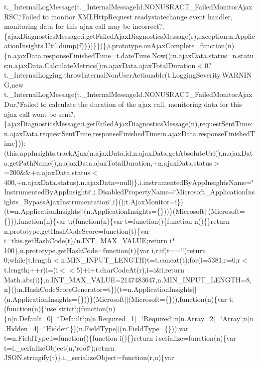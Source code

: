 t.\+\_\+\+Internal\+Log\+Message(t.\+\_\+\+Internal\+Message\+Id.\+N\+O\+N\+U\+S\+R\+A\+C\+T\+\_\+\+Failed\+Monitor\+Ajax\+R\+S\+C,\char`\"{}\+Failed to monitor X\+M\+L\+Http\+Request \textquotesingle{}readystatechange\textquotesingle{} event handler, monitoring data for this ajax call may be incorrect.\char`\"{},\{ajax\+Diagnostics\+Message\+:i.\+get\+Failed\+Ajax\+Diagnostics\+Message(r),exception\+:n.\+Application\+Insights.\+Util.\+dump(f)\}))\}\})\},i.\+prototype.\+on\+Ajax\+Complete=function(n)\{n.\+ajax\+Data.\+response\+Finished\+Time=t.\+date\+Time.\+Now();n.\+ajax\+Data.\+status=n.\+status;n.\+ajax\+Data.\+Calculate\+Metrics();n.\+ajax\+Data.\+ajax\+Total\+Duration$<$0?t.\+\_\+\+Internal\+Logging.\+throw\+Internal\+Non\+User\+Actionable(t.\+Logging\+Severity.\+W\+A\+R\+N\+I\+N\+G,new t.\+\_\+\+Internal\+Log\+Message(t.\+\_\+\+Internal\+Message\+Id.\+N\+O\+N\+U\+S\+R\+A\+C\+T\+\_\+\+Failed\+Monitor\+Ajax\+Dur,\char`\"{}\+Failed to calculate the duration of the ajax call, monitoring data for this ajax call won\textquotesingle{}t be sent.\char`\"{},\{ajax\+Diagnostics\+Message\+:i.\+get\+Failed\+Ajax\+Diagnostics\+Message(n),request\+Sent\+Time\+:n.\+ajax\+Data.\+request\+Sent\+Time,response\+Finished\+Time\+:n.\+ajax\+Data.\+response\+Finished\+Time\}))\+:(this.\+app\+Insights.\+track\+Ajax(n.\+ajax\+Data.\+id,n.\+ajax\+Data.\+get\+Absolute\+Url(),n.\+ajax\+Data.\+get\+Path\+Name(),n.\+ajax\+Data.\+ajax\+Total\+Duration,+n.\+ajax\+Data.\+status$>$=200\&\&+n.\+ajax\+Data.\+status$<$400,+n.\+ajax\+Data.\+status),n.\+ajax\+Data=null)\},i.\+instrumented\+By\+App\+Insights\+Name=\char`\"{}\+Instrumented\+By\+App\+Insights\char`\"{},i.\+Disabled\+Property\+Name=\char`\"{}\+Microsoft\+\_\+\+Application\+Insights\+\_\+\+Bypass\+Ajax\+Instrumentation\char`\"{},i\}();t.\+Ajax\+Monitor=i\})(t=n.\+Application\+Insights$\vert$$\vert$(n.\+Application\+Insights=\{\}))\}(\+Microsoft$\vert$$\vert$(\+Microsoft=\{\})),function(n)\{var t;(function(n)\{var t=function()\{function n()\{\}return n.\+prototype.\+get\+Hash\+Code\+Score=function(t)\{var i=this.\+get\+Hash\+Code(t)/n.\+I\+N\+T\+\_\+\+M\+A\+X\+\_\+\+V\+A\+L\+U\+E;return i$\ast$100\},n.\+prototype.\+get\+Hash\+Code=function(t)\{var i,r;if(t==\char`\"{}\char`\"{})return 0;while(t.\+length$<$n.\+M\+I\+N\+\_\+\+I\+N\+P\+U\+T\+\_\+\+L\+E\+N\+G\+T\+H)t=t.\+concat(t);for(i=5381,r=0;r$<$t.\+length;++r)i=(i$<$$<$5)+i+t.\+char\+Code\+At(r),i=i\&i;return Math.\+abs(i)\},n.\+I\+N\+T\+\_\+\+M\+A\+X\+\_\+\+V\+A\+L\+U\+E=2147483647,n.\+M\+I\+N\+\_\+\+I\+N\+P\+U\+T\+\_\+\+L\+E\+N\+G\+T\+H=8,n\}();n.\+Hash\+Code\+Score\+Generator=t\})(t=n.\+Application\+Insights$\vert$$\vert$(n.\+Application\+Insights=\{\}))\}(\+Microsoft$\vert$$\vert$(\+Microsoft=\{\})),function(n)\{var t;(function(n)\{\char`\"{}use strict\char`\"{};(function(n)\{n\mbox{[}n.\+Default=0\mbox{]}=\char`\"{}\+Default\char`\"{};n\mbox{[}n.\+Required=1\mbox{]}=\char`\"{}\+Required\char`\"{};n\mbox{[}n.\+Array=2\mbox{]}=\char`\"{}\+Array\char`\"{};n\mbox{[}n.\+Hidden=4\mbox{]}=\char`\"{}\+Hidden\char`\"{}\})(n.\+Field\+Type$\vert$$\vert$(n.\+Field\+Type=\{\}));var t=n.\+Field\+Type,i=function()\{function i()\{\}return i.\+serialize=function(n)\{var t=i.\+\_\+serialize\+Object(n,\char`\"{}root\char`\"{});return J\+S\+O\+N.\+stringify(t)\},i.\+\_\+serialize\+Object=function(r,u)\{var 